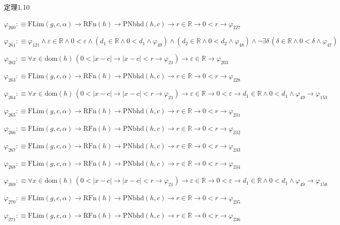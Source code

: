 \begin{fullproof}{定理1.10}
\begin{abbrevlist}
\item $\varphi_{260} :\equiv \mathrm{FLim}(g,c,\alpha) \to \mathrm{RFn}(h) \to \mathrm{PNbhd}(h,c) \to r \in \mathbb{R} \to 0 < r \to \varphi_{227}$
\item $\varphi_{261} :\equiv \varphi_{121} \land \varepsilon \in \mathbb{R} \land 0 < \varepsilon \land (d_{1} \in \mathbb{R} \land 0 < d_{1} \land \varphi_{49}) \land (d_{2} \in \mathbb{R} \land 0 < d_{2} \land \varphi_{48}) \land \neg \exists \delta\,(\delta \in \mathbb{R} \land 0 < \delta \land \varphi_{47})$
\item $\varphi_{262} :\equiv \forall x \in \mathrm{dom}(h)\,(0 < \lvert x - c \rvert \to \lvert x - c \rvert < r \to \varphi_{21}) \to \varepsilon \in \mathbb{R} \to \varphi_{203}$
\item $\varphi_{263} :\equiv \mathrm{FLim}(g,c,\alpha) \to \mathrm{RFn}(h) \to \mathrm{PNbhd}(h,c) \to r \in \mathbb{R} \to 0 < r \to \varphi_{228}$
\item $\varphi_{264} :\equiv \forall x \in \mathrm{dom}(h)\,(0 < \lvert x - c \rvert \to \lvert x - c \rvert < r \to \varphi_{21}) \to \varepsilon \in \mathbb{R} \to 0 < \varepsilon \to d_{1} \in \mathbb{R} \land 0 < d_{1} \land \varphi_{49} \to \varphi_{153}$
\item $\varphi_{265} :\equiv \mathrm{FLim}(g,c,\alpha) \to \mathrm{RFn}(h) \to \mathrm{PNbhd}(h,c) \to r \in \mathbb{R} \to 0 < r \to \varphi_{231}$
\item $\varphi_{266} :\equiv \mathrm{FLim}(g,c,\alpha) \to \mathrm{RFn}(h) \to \mathrm{PNbhd}(h,c) \to r \in \mathbb{R} \to 0 < r \to \varphi_{232}$
\item $\varphi_{267} :\equiv \mathrm{FLim}(g,c,\alpha) \to \mathrm{RFn}(h) \to \mathrm{PNbhd}(h,c) \to r \in \mathbb{R} \to 0 < r \to \varphi_{233}$
\item $\varphi_{268} :\equiv \mathrm{FLim}(g,c,\alpha) \to \mathrm{RFn}(h) \to \mathrm{PNbhd}(h,c) \to r \in \mathbb{R} \to 0 < r \to \varphi_{234}$
\item $\varphi_{269} :\equiv \forall x \in \mathrm{dom}(h)\,(0 < \lvert x - c \rvert \to \lvert x - c \rvert < r \to \varphi_{21}) \to \varepsilon \in \mathbb{R} \to 0 < \varepsilon \to d_{1} \in \mathbb{R} \land 0 < d_{1} \land \varphi_{49} \to \varphi_{158}$
\item $\varphi_{270} :\equiv \mathrm{FLim}(g,c,\alpha) \to \mathrm{RFn}(h) \to \mathrm{PNbhd}(h,c) \to r \in \mathbb{R} \to 0 < r \to \varphi_{235}$
\item $\varphi_{271} :\equiv \mathrm{FLim}(g,c,\alpha) \to \mathrm{RFn}(h) \to \mathrm{PNbhd}(h,c) \to r \in \mathbb{R} \to 0 < r \to \varphi_{236}$

\end{abbrevlist}
\end{fullproof}

